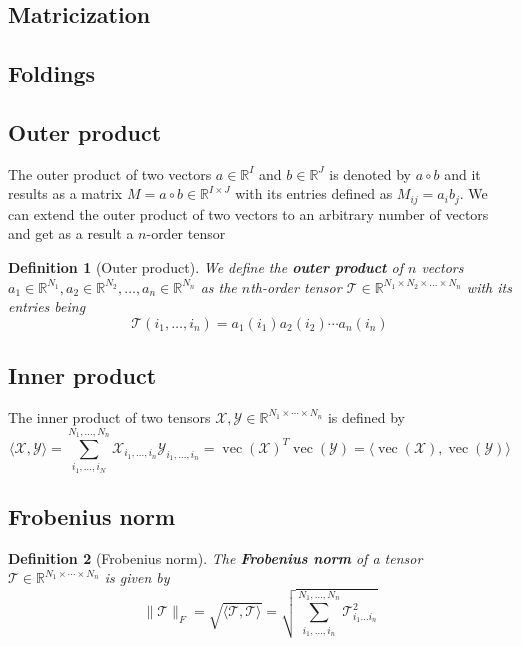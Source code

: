 \documentclass[11pt,a4paper,openright,oneside]{book}
\numberwithin{equation}{section}
\newtheorem{defn0}{Definition}[chapter]
\newenvironment{definition}{ \begin{defn0}}{\end{defn0}}
\DeclareMathOperator{\vectorize}{vec}
\begin{document}
\subsection*{Matricization}

\subsection*{Foldings}

\subsection*{Outer product}
The outer product of two vectors $a \in \mathbb{R}^I$ and $b \in \mathbb{R}^J$ is denoted by $a \circ b$ and it results
as a matrix $M = a \circ b \in \mathbb{R}^{I \times J}$ with its entries defined as $M_{ij} = a_i b_j$. We can extend the outer
product of two vectors to an arbitrary number of vectors and get as a result a $n$-order tensor

\begin{definition}[Outer product]
    We define the \textbf{outer product} of $n$ vectors 
    $a_1 \in \mathbb{R}^{N_1}, a_2 \in \mathbb{R}^{N_2}, \dots, a_n \in \mathbb{R}^{N_n}$
    as the $n$th-order tensor $\mathcal{T} \in \mathbb{R}^{N_1 \times N_2 \times \dots \times N_n}$ with its entries being
    $$\mathcal{T}(i_1, \dots, i_n) = a_1(i_1) a_2(i_2) \cdots a_n(i_n)$$
\end{definition}
\subsection*{Inner product}
The inner product of two tensors $\mathcal{X}, \mathcal{Y} \in \mathbb{R}^{N_1 \times \cdots \times N_n}$ is defined by
$$\langle \mathcal{X},\mathcal{Y} \rangle = \sum_{i_1, \dots, i_N}^{N_1, \dots, N_n} \mathcal{X}_{i_1, \dots, i_n} \mathcal{Y}_{i_1, \dots, i_n} = 
\vectorize(\mathcal{X})^T \vectorize(\mathcal{Y}) = \langle \vectorize(\mathcal{X}), \vectorize(\mathcal{Y}) \rangle$$

\subsection*{Frobenius norm}
\begin{definition}[Frobenius norm]
The \textbf{Frobenius norm} of a tensor $\mathcal{T} \in \mathbb{R}^{N_1 \times \cdots \times N_n}$ is given by
$$\|\mathcal{T}\|_F = \sqrt{\langle \mathcal{T}, \mathcal{T} \rangle} = \sqrt{\sum_{i_1, \dots, i_n}^{N_1, \dots, N_n}
\mathcal{T}_{i_1 \dots i_n}^2}$$
\end{definition}
\end{document}

